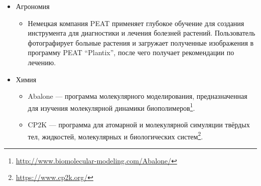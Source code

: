 \begin{itemize}
\item{Агрономия}

\begin{itemize}
\item{Немецкая компания PEAT применяет глубокое обучение для создания инструмента для диагностики и лечения болезней растений. Пользователь фотографирует больные растения и загружает полученные изображения в программу PEAT ``Plantix'', после чего получает рекомендации по лечению\cite{almanac3}.}
\end{itemize}

\item{Химия}

\begin{itemize}
\item{Abalone --- программа молекулярного моделирования, предназначенная для изучения молекулярной динамики био\-по\-ли\-ме\-ров\cite{chem}\footnote{\url{http://www.biomolecular-modeling.com/Abalone/}}.}

\item{CP2K --- программа для атомарной и молекулярной симуляции твёрдых тел, жидкостей, молекулярных и биологических сис\-тем\cite{chem}\footnote{\url{https://www.cp2k.org/}}.}


\end{itemize}
\end{itemize}

